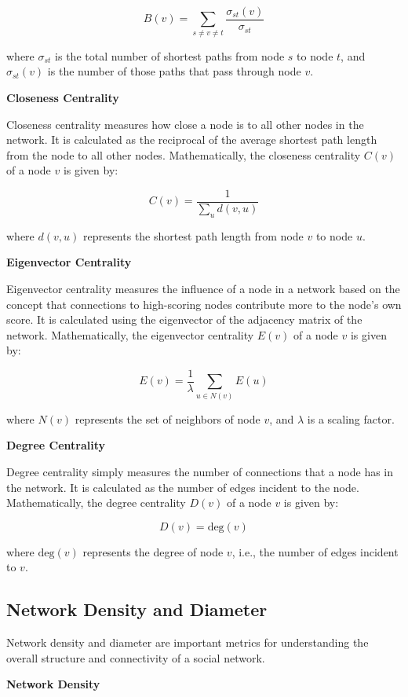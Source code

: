 \documentclass[12pt]{book} %
\begin{document}
\[ B(v) = \sum_{s \neq v \neq t} \frac{\sigma_{st}(v)}{\sigma_{st}} \]

where \(\sigma_{st}\) is the total number of shortest paths from node \(s\) to node \(t\), and \(\sigma_{st}(v)\) is the number of those paths that pass through node \(v\).

\textbf{Closeness Centrality}

Closeness centrality measures how close a node is to all other nodes in the network. It is calculated as the reciprocal of the average shortest path length from the node to all other nodes. Mathematically, the closeness centrality \(C(v)\) of a node \(v\) is given by:

\[ C(v) = \frac{1}{\sum_{u} d(v,u)} \]

where \(d(v,u)\) represents the shortest path length from node \(v\) to node \(u\).

\textbf{Eigenvector Centrality}

Eigenvector centrality measures the influence of a node in a network based on the concept that connections to high-scoring nodes contribute more to the node's own score. It is calculated using the eigenvector of the adjacency matrix of the network. Mathematically, the eigenvector centrality \(E(v)\) of a node \(v\) is given by:

\[ E(v) = \frac{1}{\lambda} \sum_{u \in N(v)} E(u) \]

where \(N(v)\) represents the set of neighbors of node \(v\), and \(\lambda\) is a scaling factor.

\textbf{Degree Centrality}

Degree centrality simply measures the number of connections that a node has in the network. It is calculated as the number of edges incident to the node. Mathematically, the degree centrality \(D(v)\) of a node \(v\) is given by:

\[ D(v) = \text{deg}(v) \]

where \(\text{deg}(v)\) represents the degree of node \(v\), i.e., the number of edges incident to \(v\).

\subsection{Network Density and Diameter}

Network density and diameter are important metrics for understanding the overall structure and connectivity of a social network.

\textbf{Network Density}
\end{document}
